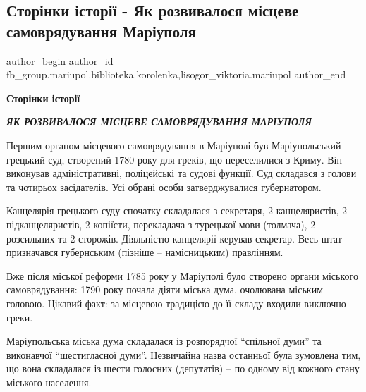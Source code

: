  
 
 
 
 

\subsection{Сторінки історії - Як розвивалося місцеве самоврядування Маріуполя}
\label{sec:06_12_2022.fb.fb_group.mariupol.biblioteka.korolenka.1.stor_nki__stor____y}
 
\ifcmt
 author_begin
   author_id fb_group.mariupol.biblioteka.korolenka,lisogor_viktoria.mariupol
 author_end
\fi

\textbf{Сторінки історії}

\textbf{\emph{ЯК РОЗВИВАЛОСЯ МІСЦЕВЕ САМОВРЯДУВАННЯ МАРІУПОЛЯ}}

Першим органом місцевого самоврядування в Маріуполі був Маріупольський грецький
суд, створений 1780 року для греків, що переселилися з Криму. Він виконував
адміністративні, поліцейські та судові функції. Суд складався з голови та
чотирьох засідателів. Усі обрані особи затверджувалися губернатором.

Канцелярія грецького суду спочатку складалася з секретаря, 2 канцеляристів, 2
підканцеляристів, 2 копіїсти, перекладача з турецької мови (толмача), 2
розсильних та 2 сторожів. Діяльністю канцелярії керував секретар. Весь штат
призначався губернським (пізніше – намісницьким) правлінням.

Вже після міської реформи 1785 року у Маріуполі було створено органи міського
самоврядування: 1790 року почала діяти міська дума, очолювана міським головою.
Цікавий факт: за місцевою традицією до її складу входили виключно греки.

Маріупольська міська дума складалася із розпорядчої \enquote{спільної думи} та
виконавчої \enquote{шестигласної думи}. Незвичайна назва останньої була зумовлена тим,
що вона складалася із шести голосних (депутатів) – по одному від кожного стану
міського населення.

